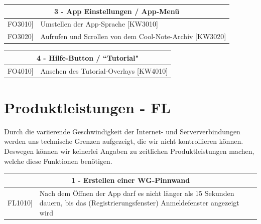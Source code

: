 \documentclass[a4paper]{scrreprt}
\begin{document}
    		\vspace{5mm}
    		
    		\begin{table}[h!]
    			\centering
    			\label{my-label}
    			\begin{tabular}{p{2cm}p{12cm}}
    				
    				\multicolumn{2}{c}{\textbf{3 - App Einstellungen / App-Menü}} \\ \hline
    				\centering{[}FO3010{]} & Umstellen der App-Sprache {[}KW3010{]}\\
    				\centering{[}FO3020{]} & Aufrufen und Scrollen von dem Cool-Note-Archiv {[}KW3020{]}\\
    				\hline
    			\end{tabular}
    		\end{table}
    		
    		\vspace{5mm}
    		
    		\begin{table}[h!]
    			\centering
    			\label{my-label}
    			\begin{tabular}{p{2cm}p{12cm}}
    				
    				\multicolumn{2}{c}{\textbf{4 - Hilfe-Button / ``Tutorial"}} \\ \hline
    				\centering{[}FO4010{]} & Ansehen des Tutorial-Overlays {[}KW4010{]}\\    				
    				\hline
    			\end{tabular}
    		\end{table}
    		
    		\vspace{1cm}
    		
    		\newpage
    		
    		\section{Produktleistungen - FL}
    		Durch die variierende Geschwindigkeit der Internet- und Serververbindungen werden uns technische Grenzen aufgezeigt, die wir nicht kontrollieren können. Deswegen können wir keinerlei Angaben zu zeitlichen Produktleistungen machen, welche diese Funktionen benötigen. 
    		\\
    		
    		\begin{table}[h!]
    			\centering
    			\label{my-label}
    			\begin{tabular}{p{2cm}p{12cm}}
    				
    				\multicolumn{2}{c}{\textbf{1 - Erstellen einer WG-Pinnwand}} \\ \hline
    				\centering{[}FL1010{]} & Nach dem Öffnen der App darf es nicht länger als 15 Sekunden dauern, bis das (Registrierungsfenster) Anmeldefenster angezeigt wird \\
    				\hline
    			\end{tabular}
    		\end{table}
    		
\end{document}
